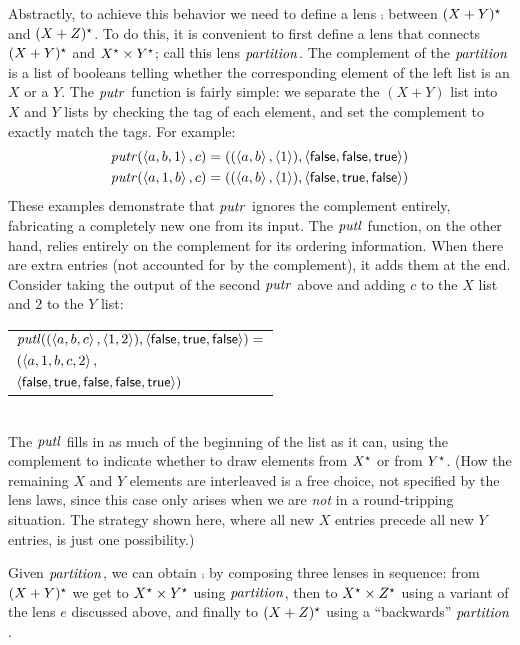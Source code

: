 Abstractly, to achieve this behavior we need to define a lens $\comp$
between $(X+Y)^\star$ and 
$(X+Z)^\star$.  To do this, it is convenient to first define a lens that
connects $(X+Y)^\star$ and $X^\star \times Y^\star$; call this lens $\mathit{partition}$.
The complement of the $\mathit{partition}$ is a list of booleans telling whether the
corresponding element of the left list is an $X$ or a $Y$. The $\mathit{putr}$
function is fairly simple: we separate the $(X+Y)$ list into $X$ and $Y$
lists by checking the tag of each element, and set the complement to exactly
match the tags. For example:
\begin{align*}
\mathit{putr}(\left< a, b, 1\right>,c) &=
    ((\left<a,b\right>,\left<1\right>),\left<\mathsf{false},\mathsf{false},\mathsf{true}\right>) \\
\mathit{putr}(\left< a, 1, b\right>,c) &=
    ((\left<a,b\right>,\left<1\right>),\left<\mathsf{false},\mathsf{true},\mathsf{false}\right>)
\end{align*}
These examples demonstrate that $\mathit{putr}$ ignores the complement entirely,
fabricating a completely new one from its input. The $\mathit{putl}$ function, on
the other hand, relies entirely on the complement for its ordering
information. When there are extra entries (not accounted for by the
complement), it adds them at the 
end. Consider taking the output of the second $\mathit{putr}$ above and
adding $c$ to the $X$ list and $2$ to the $Y$ list:
\\[1.5ex]
\noindent\begin{tabular}{l}
$\mathit{putl}((\left<a,b,c\right>,\left<1,2\right>),\left<\mathsf{false},\mathsf{true},\mathsf{false}\right>) =$ \\
\qquad$(\left< a, 1, b, c, 2\right>,$ \\
\qquad$\left<\mathsf{false},\mathsf{true},\mathsf{false},\mathsf{false},\mathsf{true}\right>)$
\end{tabular}
\\[1.5ex]
\noindent The $\mathit{putl}$ fills in as much of the beginning of the list as it
can, using the complement to indicate whether to draw elements from $X^\star$
or from $Y^\star$.  (How the remaining $X$ and $Y$ elements are interleaved
is a free choice, not specified by the lens laws, since this case only
arises when we are {\em not} in a round-tripping situation. The strategy
shown here, where all new $X$ entries precede all new $Y$ entries, is just
one possibility.)

Given $\mathit{partition}$, we can obtain $\comp$ by composing three lenses in
sequence: from $(X+Y)^\star$ we get to $X^\star \times Y^\star$ using
$\mathit{partition}$, then to $X^\star \times Z^\star$ using a variant of the lens $e$ 
discussed above, and finally to $(X+Z)^\star$ using a ``backwards''
$\mathit{partition}$. 

